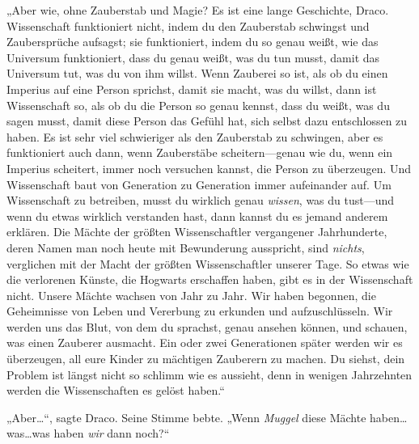 „Aber wie, ohne Zauberstab und Magie? Es ist eine lange Geschichte, Draco. Wissenschaft funktioniert nicht, indem du den Zauberstab schwingst und Zaubersprüche aufsagst; sie funktioniert, indem du so genau weißt, wie das Universum funktioniert, dass du genau weißt, was du tun musst, damit das Universum tut, was du von ihm willst. Wenn Zauberei so ist, als ob du einen Imperius auf eine Person sprichst, damit sie macht, was du willst, dann ist Wissenschaft so, als ob du die Person so genau kennst, dass du weißt, was du sagen musst, damit diese Person das Gefühl hat, sich selbst dazu entschlossen zu haben. Es ist sehr viel schwieriger als den Zauberstab zu schwingen, aber es funktioniert auch dann, wenn Zauberstäbe scheitern—genau wie du, wenn ein Imperius scheitert, immer noch versuchen kannst, die Person zu überzeugen. Und Wissenschaft baut von Generation zu Generation immer aufeinander auf. Um Wissenschaft zu betreiben, musst du wirklich genau \emph{wissen}, was du tust—und wenn du etwas wirklich verstanden hast, dann kannst du es jemand anderem erklären. Die Mächte der größten Wissenschaftler vergangener Jahrhunderte, deren Namen man noch heute mit Bewunderung ausspricht, sind \emph{nichts}, verglichen mit der Macht der größten Wissenschaftler unserer Tage. So etwas wie die verlorenen Künste, die Hogwarts erschaffen haben, gibt es in der Wissenschaft nicht. Unsere Mächte wachsen von Jahr zu Jahr. Wir haben begonnen, die Geheimnisse von Leben und Vererbung zu erkunden und aufzuschlüsseln. Wir werden uns das Blut, von dem du sprachst, genau ansehen können, und schauen, was einen Zauberer ausmacht. Ein oder zwei Generationen später werden wir es überzeugen, all eure Kinder zu mächtigen Zauberern zu machen. Du siehst, dein Problem ist längst nicht so schlimm wie es aussieht, denn in wenigen Jahrzehnten werden die Wissenschaften es gelöst haben.“

„Aber…“, sagte Draco. Seine Stimme bebte. „Wenn \emph{Muggel} diese Mächte haben…was…was haben \emph{wir} dann noch?“

